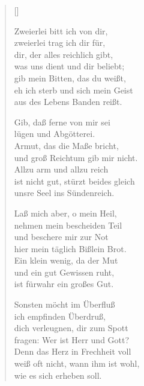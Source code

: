 \begin{multicols}{2}
\settowidth{\versewidth}{Ach, mein Gott, mein Schatz, mein Licht,}
\begin{verse}[\versewidth]

 Zweierlei bitt ich von dir,\\
zweierlei trag ich dir für,\\
dir, der alles reichlich gibt,\\
was uns dient und dir beliebt;\\
gib mein Bitten, das du weißt,\\
eh ich sterb und sich mein Geist\\
aus des Lebens Banden reißt.

 Gib, daß ferne von mir sei\\
lügen und Abgötterei.\\
Armut, das die Maße bricht,\\
und groß Reichtum gib mir nicht.\\
Allzu arm und allzu reich\\
ist nicht gut, stürzt beides gleich\\
unsre Seel ins Sündenreich.

 Laß mich aber, o mein Heil,\\
nehmen mein bescheiden Teil\\
und beschere mir zur Not\\
hier mein täglich Bißlein Brot.\\
Ein klein wenig, da der Mut\\
und ein gut Gewissen ruht,\\
ist fürwahr ein großes Gut.

 Sonsten möcht im Überfluß\\
ich empfinden Überdruß,\\
dich verleugnen, dir zum Spott\\
fragen: Wer ist Herr und Gott?\\
Denn das Herz in Frechheit voll\\
weiß oft nicht, wann ihm ist wohl,\\
wie es sich erheben soll.


\end{verse}
\end{multicols}
